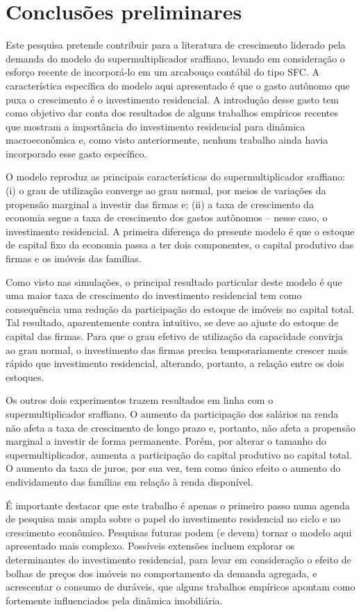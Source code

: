 \section{Conclusões preliminares}\label{Conclusao_Modelo}

Este pesquisa pretende contribuir para a literatura de crescimento liderado pela demanda do modelo do supermultiplicador sraffiano, levando em consideração o esforço recente de incorporá-lo em um arcabouço contábil do tipo SFC.  A característica específica do modelo aqui apresentado é que o gasto autônomo que puxa o crescimento é o investimento residencial. A introdução desse gasto tem como objetivo dar conta dos resultados de alguns trabalhos empíricos recentes que mostram a importância do investimento residencial para dinâmica macroeconômica e, como visto anteriormente, nenhum trabalho ainda havia incorporado esse gasto específico. 

O modelo reproduz as principais características do supermultiplicador sraffiano: (i) o grau de utilização converge ao grau normal, por meios de variações da propensão marginal a investir das firmas e; (ii) a taxa de crescimento da economia segue a taxa de crescimento dos gastos autônomos – nesse caso, o investimento residencial. A primeira diferença do  presente modelo é que o estoque de capital fixo da economia passa a ter dois componentes, o capital produtivo das firmas e os imóveis das famílias. 

Como visto nas simulações, o principal resultado particular deste modelo é que uma maior taxa de crescimento do investimento residencial tem como consequência uma redução da participação do estoque de imóveis no capital total. Tal resultado, aparentemente contra intuitivo, se deve ao ajuste do estoque de capital das firmas. Para que o grau efetivo de utilização da capacidade convirja ao grau normal, o investimento das firmas precisa temporariamente crescer mais rápido que investimento residencial, alterando, portanto, a relação entre os dois estoques. 

Os outros dois experimentos trazem resultados em linha com o supermultiplicador sraffiano. O aumento da participação dos salários na renda não afeta a taxa de crescimento de longo prazo e, portanto, não afeta a propensão marginal a investir de forma permanente. Porém, por alterar o tamanho do supermultiplicador, aumenta a participação do capital produtivo no capital total. O aumento da taxa de juros, por sua vez, tem como único efeito o aumento do endividamento das famílias em relação à renda disponível. 

É importante destacar que este trabalho é apenas o primeiro passo numa agenda de pesquisa mais ampla sobre o papel do investimento residencial no ciclo e no crescimento econômico. Pesquisas futuras podem (e devem) tornar o modelo aqui apresentado mais complexo. Possíveis extensões incluem explorar os determinantes do investimento residencial, para levar em consideração o efeito de bolhas de preços dos imóveis no comportamento da demanda agregada, e acrescentar o consumo de duráveis, que alguns trabalhos empíricos apontam como fortemente influenciados pela dinâmica imobiliária. 
